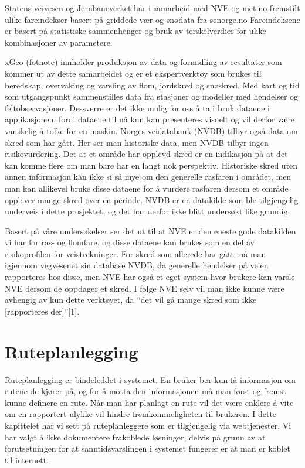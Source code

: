 \documentclass[a4paper,norsk,oneside]{book}
\begin{document}
Statens veivesen og Jernbaneverket har i samarbeid med NVE og met.no fremstilt ulike fareindekser basert på griddede vær-og snødata fra senorge.no
Fareindeksene er basert på statistiske sammenhenger og bruk av terskelverdier for ulike kombinasjoner av parametere. 

xGeo (fotnote) innholder produksjon av data og formidling av resultater som kommer ut av dette samarbeidet og er et ekspertverktøy som brukes til beredskap, overvåking og varsling av flom, jordskred og snøskred. Med kart og tid som utgangspunkt sammenstilles data fra stasjoner og modeller med hendelser og feltobservasjoner. Dessverre er det ikke mulig for oss å ta i bruk dataene i applikasjonen, fordi dataene til nå kun kan presenteres visuelt og vil derfor være vanskelig å tolke for en maskin.
	Norges veidatabank (NVDB) tilbyr også data om skred som har gått. Her ser man historiske data, men NVDB tilbyr ingen risikovurdering. Det at et område har opplevd skred er en indikasjon på at det kan komme flere om man bare har en langt nok perspektiv.  Historiske skred uten annen informasjon kan ikke si så mye om den generelle rasfaren i området, men man kan allikevel bruke disse dataene for å vurdere rasfaren dersom et område opplever mange skred over en periode. NVDB er en datakilde som ble tilgjengelig underveis i dette prosjektet, og det har derfor ikke blitt undersøkt like grundig.

Basert på våre undersøkelser ser det ut til at NVE er den eneste gode datakilden vi har for ras- og flomfare, og disse dataene kan brukes som en del av risikoprofilen for veistrekninger. For skred som allerede har gått må man igjennom vegvesenet sin database NVDB, da generelle hendelser på veien rapporteres hos disse, men NVE har også et eget system hvor brukere kan varsle NVE dersom de oppdager et skred. I følge NVE selv vil man ikke kunne være avhengig av kun dette verktøyet, da “det vil gå mange skred som ikke [rapporteres der]”[1].

\section{Ruteplanlegging}
Ruteplanlegging er bindeleddet i systemet. En bruker bør kun få informasjon om rutene de kjører på, og for å motta den informasjonen må man først og fremst kunne definere en rute. Når man har planlagt en rute vil det være enklere å vite om en rapportert ulykke vil hindre fremkommeligheten til brukeren. I dette kapittelet har vi sett på ruteplanleggere som er tilgjengelig via webtjenester. Vi har valgt å ikke dokumentere frakoblede løsninger, delvis på grunn av at forutsetningen for at sanntidsvarslingen i systemet fungerer er at man er koblet til internett.
\end{document}
